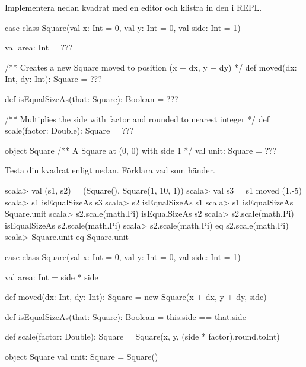 \Subtask Implementera nedan kvadrat med en editor och klistra in den i REPL.

\begin{Code}
case class Square(val x: Int = 0, val y: Int = 0, val side: Int = 1) {
  val area: Int = ???

  /** Creates a new Square moved to position (x + dx, y + dy) */
  def moved(dx: Int, dy: Int): Square = ???

  def isEqualSizeAs(that: Square): Boolean = ???

  /** Multiplies the side with factor and rounded to nearest integer */
  def scale(factor: Double): Square = ???
}
object Square {
  /** A Square at (0, 0) with side 1 */
  val unit: Square = ???
}
\end{Code}

\Subtask Testa din kvadrat enligt nedan. Förklara vad som händer.

\begin{REPL}
scala> val (s1, s2) = (Square(), Square(1, 10, 1))
scala> val s3 = s1 moved (1,-5)
scala> s1 isEqualSizeAs s3
scala> s2 isEqualSizeAs s1
scala> s1 isEqualSizeAs Square.unit
scala> s2.scale(math.Pi) isEqualSizeAs s2
scala> s2.scale(math.Pi) isEqualSizeAs s2.scale(math.Pi)
scala> s2.scale(math.Pi) eq s2.scale(math.Pi)
scala> Square.unit eq Square.unit
\end{REPL}

\SOLUTION

\TaskSolved \what

\SubtaskSolved

\begin{Code}
case class Square(val x: Int = 0, val y: Int = 0, val side: Int = 1) {
	val area: Int = side * side

	def moved(dx: Int, dy: Int): Square = new Square(x + dx, y + dy, side)

	def isEqualSizeAs(that: Square): Boolean = this.side == that.side

	def scale(factor: Double): Square =
    Square(x, y, (side * factor).round.toInt)
}

object Square {
	val unit: Square = Square()
}
\end{Code}

